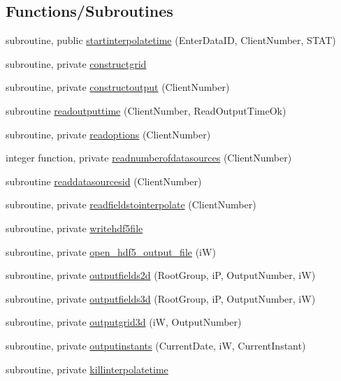 \subsection*{Functions/\+Subroutines}
\begin{DoxyCompactItemize}
\item 
subroutine, public \mbox{\hyperlink{namespacemoduleinterpolatetime_a9ee23aab51e3ce1e657af4c8074b2ae2}{startinterpolatetime}} (Enter\+Data\+ID, Client\+Number, S\+T\+AT)
\item 
subroutine, private \mbox{\hyperlink{namespacemoduleinterpolatetime_ae85e58c7f2328078eb15ab901ab2cec2}{constructgrid}}
\item 
subroutine, private \mbox{\hyperlink{namespacemoduleinterpolatetime_af73c04e1fcd85cc293ad3c88c2420ff2}{constructoutput}} (Client\+Number)
\item 
subroutine \mbox{\hyperlink{namespacemoduleinterpolatetime_a8c2cfcaa51773241235e7d16f6cb9e46}{readoutputtime}} (Client\+Number, Read\+Output\+Time\+Ok)
\item 
subroutine, private \mbox{\hyperlink{namespacemoduleinterpolatetime_a37ac04a065528663fbfe37b1238128fd}{readoptions}} (Client\+Number)
\item 
integer function, private \mbox{\hyperlink{namespacemoduleinterpolatetime_ad3414b04b75a8f0e9e8aaf053859dc2e}{readnumberofdatasources}} (Client\+Number)
\item 
subroutine \mbox{\hyperlink{namespacemoduleinterpolatetime_ad261b036016fd92d9944eb5b6d0332b6}{readdatasourcesid}} (Client\+Number)
\item 
subroutine, private \mbox{\hyperlink{namespacemoduleinterpolatetime_a75df12a5adb5a489b09f35e20b069242}{readfieldstointerpolate}} (Client\+Number)
\item 
subroutine, private \mbox{\hyperlink{namespacemoduleinterpolatetime_aa6ef370ca77afaafd53df4bf43525f3d}{writehdf5file}}
\item 
subroutine, private \mbox{\hyperlink{namespacemoduleinterpolatetime_af0bb28d64bc31ae488ca76a682f246f5}{open\+\_\+hdf5\+\_\+output\+\_\+file}} (iW)
\item 
subroutine, private \mbox{\hyperlink{namespacemoduleinterpolatetime_a89452771fcee1960a251bf4fb95851c6}{outputfields2d}} (Root\+Group, iP, Output\+Number, iW)
\item 
subroutine, private \mbox{\hyperlink{namespacemoduleinterpolatetime_afb140a4246a55d10d57741eac9e8472e}{outputfields3d}} (Root\+Group, iP, Output\+Number, iW)
\item 
subroutine, private \mbox{\hyperlink{namespacemoduleinterpolatetime_a0a16c53d72886b47809d200696776b0c}{outputgrid3d}} (iW, Output\+Number)
\item 
subroutine, private \mbox{\hyperlink{namespacemoduleinterpolatetime_a74dbf441733e6031ead9d8056ffa421f}{outputinstants}} (Current\+Date, iW, Current\+Instant)
\item 
subroutine, private \mbox{\hyperlink{namespacemoduleinterpolatetime_a8b49478334350c51e3c3ffbd530b77c7}{killinterpolatetime}}
\end{DoxyCompactItemize}
